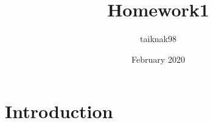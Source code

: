 \documentclass{article}
\title{Homework1}
\author{taiknak98 }
\date{February 2020}
\begin{document}
\maketitle

\section{Introduction}
\end{document}
